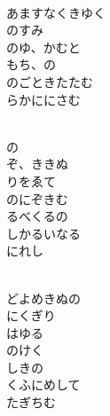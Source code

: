 \documentclass[10pt,b5j]{tarticle} %
\begin{document}
\vspace{1.5em} %
\newcommand{\linespace}{0.5em} %
\newcommand{\blocksize}{0.5\hsize} %
\newcommand{\itemmargin}{3em} %
\begin{enumerate} %
    \setlength{\itemindent}{\itemmargin} %
    \begin{minipage}[c]{\blocksize}
    
        \vspace{\linespace}
        \item~\\
        あますなくきゆく\\
        のすみ\\
        のゆ、かむと\\
        もち、の\\
        のごときたたむ\\
        らかににさむ
        
    \end{minipage}
    \begin{minipage}[c]{\blocksize}
        
        \vspace{\linespace}
        \item~\\
        の\\
        ぞ、ききぬ\\
        りをゑて\\
        のにぞきむ\\
        るべくるの\\
        しかるいなる\\
        にれし
        
    \end{minipage}
    \begin{minipage}[c]{\blocksize}
        
        \vspace{\linespace}
        \item~\\
        どよめきぬの\\
        にくぎり\\
        はゆる\\
        のけく\\
        しきの\\
        くふにめして\\
        たぎちむ
        

\end{minipage}
\end{enumerate}
\end{document}
